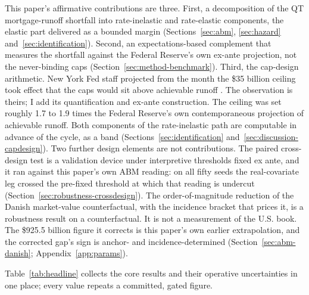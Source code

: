 \documentclass[12pt]{article}
\begin{document}
This paper's affirmative contributions are three. First, a decomposition of the QT mortgage-runoff shortfall into rate-inelastic and rate-elastic components, the elastic part delivered as a bounded margin (Sections~\ref{sec:abm}, \ref{sec:hazard} and~\ref{sec:identification}). Second, an expectations-based complement that measures the shortfall against the Federal Reserve's own ex-ante projection, not the never-binding caps (Section~\ref{sec:method-benchmark}). Third, the cap-design arithmetic. New York Fed staff projected from the month the \$35 billion ceiling took effect that the caps would sit above achievable runoff \citep{nyfed2022}. The observation is theirs; I add its quantification and ex-ante construction. The ceiling was set roughly 1.7 to 1.9 times the Federal Reserve's own contemporaneous projection of achievable runoff. Both components of the rate-inelastic path are computable in advance of the cycle, as a band (Sections~\ref{sec:identification} and~\ref{sec:discussion-capdesign}). Two further design elements are not contributions. The paired cross-design test is a validation device under interpretive thresholds fixed ex ante, and it ran against this paper's own ABM reading: on all fifty seeds the real-covariate leg crossed the pre-fixed threshold at which that reading is undercut (Section~\ref{sec:robustness-crossdesign}). The order-of-magnitude reduction of the Danish market-value counterfactual, with the incidence bracket that prices it, is a robustness result on a counterfactual. It is not a measurement of the U.S. book. The \$925.5 billion figure it corrects is this paper's own earlier extrapolation, and the corrected gap's sign is anchor- and incidence-determined (Section~\ref{sec:abm-danish}; Appendix~\ref{app:params}).

Table~\ref{tab:headline} collects the core results and their operative uncertainties in one place; every value repeats a committed, gated figure.
\end{document}
